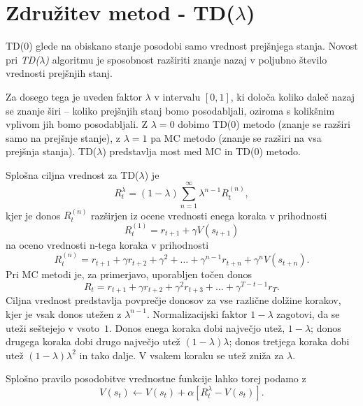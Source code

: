 \documentclass[a4paper, oneside, 12pt]{report}
\begin{document}
\section{Združitev metod - TD($\lambda$)}
TD(0) glede na obiskano stanje posodobi samo vrednost prejšnjega stanja. Novost pri {\em TD($\lambda$)} algoritmu je sposobnost razširiti znanje nazaj v poljubno število vrednosti prejšnjih stanj.

Za dosego tega je uveden faktor $\lambda$ v intervalu ${[0, 1]}$, ki določa koliko daleč nazaj se znanje širi -- koliko prejšnjih stanj bomo posodabljali, oziroma s kolikšnim vplivom jih bomo posodabljali. Z $\lambda = 0$ dobimo TD(0) metodo (znanje se razširi samo na prejšnje stanje), z $\lambda = 1$ pa MC metodo (znanje se razširi na vsa prejšnja stanja). TD($\lambda$) predstavlja most med MC in TD(0) metodo. 

Splošna ciljna vrednost za TD($\lambda$) je
\begin{equation}
R_t^\lambda = (1 - \lambda) \sum_{n=1}^\infty \lambda^{n-1} R_t^{(n)},
\end{equation}
kjer je donos $R_t^{(n)}$ razširjen iz ocene vrednosti enega koraka v prihodnosti
\begin{equation}
R_t^{(1)} = r_{t+1} + \gamma V(s_{t+1})
\end{equation}
na oceno vrednosti n-tega koraka v prihodnosti
\begin{equation}
R_t^{(n)} = r_{t+1} + \gamma r_{t+2} + \gamma^2 + \dots + \gamma^{n-1} r_{t+n} + \gamma^n V(s_{t+n}).
\end{equation}
Pri MC metodi je, za primerjavo, uporabljen točen donos
\begin{equation}
R_t = r_{t+1} + \gamma r_{t+2} + \gamma^2 r_{t+3} + \dots + \gamma^{T-t-1} r_T.
\end{equation}
Ciljna vrednost predstavlja povprečje donosov za vse različne dolžine korakov, kjer je vsak donos utežen z $\lambda^{n-1}$. Normalizacijski faktor $1 - \lambda$ zagotovi, da se uteži seštejejo v vsoto~$1$. Donos enega koraka dobi največjo utež, $1 - \lambda$; donos drugega koraka dobi drugo največjo utež $(1 - \lambda)\lambda$; donos tretjega koraka dobi utež $(1 - \lambda)\lambda^2$ in tako dalje. V vsakem koraku se utež zniža za $\lambda$.

Splošno pravilo posodobitve vrednostne funkcije lahko torej podamo z
\begin{equation}
V(s_t) \gets V(s_t) + \alpha[R_t^\lambda - V(s_t)].
\end{equation}
\end{document}
